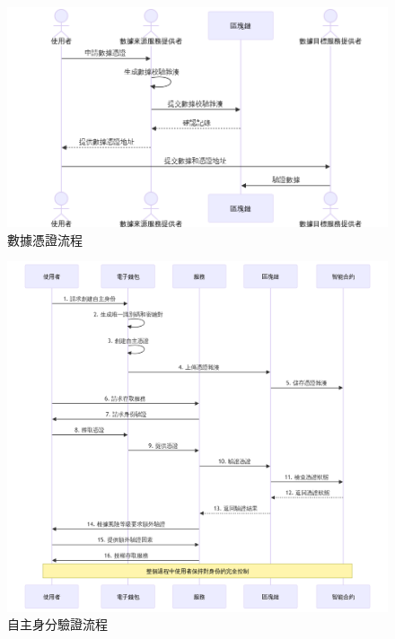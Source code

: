 \begin{figure}[p]
  \centering
  \includegraphics[width=\linewidth]{figures/DA-UML.png}
  \caption{數據憑證流程}
  \label{fig:appendix-da-uml}
\end{figure}
\clearpage
\begin{figure}[p]
  \centering
  \includegraphics[width=\linewidth]{figures/new-self-auth.png}
  \caption{自主身分驗證流程}
  \label{fig:appendix-self-auth}
\end{figure}
\clearpage
